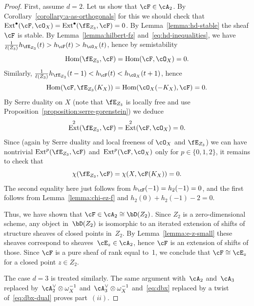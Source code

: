 \documentclass[11pt]{amsart}
\DeclareMathOperator{\Hom}{\mathrm{Hom}}
\DeclareMathOperator{\Ext}{\mathrm{Ext}}
\theoremstyle{plain}
\theoremstyle{definition}
\theoremstyle{remark}
\begin{document}
\begin{proof}
First, assume $d = 2$.
Let us show that $\cF \in \cA_2$. 
By Corollary~\ref{corollary:a-as-orthogonals} for this we should check that~$\Ext^\bullet(\cF,\cO_X) = \Ext^\bullet(\fE_{Z_3},\cF) = 0$.
By Lemma~\ref{lemma:hd-stable} the sheaf $\cF$ is stable.
By Lemma~\ref{lemma:hilbert-fz} and~\eqref{eq:hd-inequalities}, we have $\frac1{\ell(Z_3)}h_{\fE_{Z_3}}(t) > h_\cF(t) > h_{\cO_X}(t)$, hence by semistability 
\begin{equation*}
\Hom(\fE_{Z_3},\cF) = \Hom(\cF,\cO_X) = 0.
\end{equation*}
Similarly, $\frac1{\ell(Z_3)}h_{\fE_{Z_3}}(t-1) < h_\cF(t) < h_{\cO_X}(t+1)$, hence
\begin{equation*}
\Hom(\cF,\fE_{Z_3}(K_X)) = \Hom(\cO_X(-K_X),\cF) = 0.
\end{equation*}
By Serre duality on $X$ (note that $\fE_{Z_3}$ is locally free and use Proposition~\ref{proposition:serre-gorenstein}) we deduce 
\begin{equation*}
\Ext^2(\fE_{Z_3},\cF) = \Ext^2(\cF,\cO_X) = 0.
\end{equation*}
Since (again by Serre duality and local freeness of $\cO_X$ and $\fE_{Z_3}$) we can have 
nontrivial $\Ext^p(\fE_{Z_3},\cF)$ and~$\Ext^p(\cF,\cO_X)$ only for $p \in \{0,1,2\}$,
it remains to check that 
\begin{equation*}
\chi(\fE_{Z_3},\cF) = \chi(X,\cF(K_X)) = 0.
\end{equation*}
The second equality here just follows from $h_\cF(-1) = h_2(-1) = 0$,
and the first follows from Lemma~\ref{lemma:chi-ez-f} and $h_2(0) + h_2(-1) - 2 = 0$.

Thus, we have shown that $\cF \in \cA_2 \cong \bD(Z_2)$. 
Since $Z_2$ is a zero-dimensional scheme, any object in~$\bD(Z_2)$ is isomorphic 
to an iterated extension of shifts of structure sheaves of closed points in~$Z_2$.
By Lemma~\ref{lemma:e-z-small} these sheaves correspond to sheaves~$\cE_z \in \cA_2$, hence $\cF$ is an extension of shifts of those.
Since $\cF$ is a pure sheaf of rank equal to~1, 
we conclude that $\cF \cong \cE_z$ for a closed point $z \in Z_2$.

The case $d = 3$ is treated similarly. 
% 
The same argument with~$\cA_2$ and~$\cA_3$ replaced by~$\cA_2^\vee \otimes \omega_X^{-1}$ and~$\cA_3^\vee \otimes \omega_X^{-1}$ 
and~\eqref{eq:dbx} replaced by a twist of~\eqref{eq:dbx-dual} proves part~$(ii)$.
\end{proof}
\end{document}
